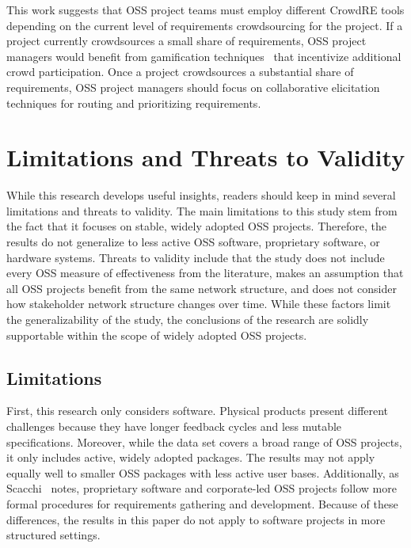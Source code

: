This work suggests that OSS project teams must employ different CrowdRE tools depending on the current level of requirements crowdsourcing for the project. If a project currently crowdsources a small share of requirements, OSS project managers would benefit from gamification techniques~\cite{snijders, snijders2} that incentivize additional crowd participation. Once a project crowdsources a substantial share of requirements, OSS project managers should focus on collaborative elicitation techniques for routing and prioritizing requirements.

\section{Limitations and Threats to Validity}
\label{limitations}

While this research develops useful insights, readers should keep in mind several limitations and threats to validity. The main limitations to this study stem from the fact that it focuses on stable, widely adopted OSS projects. Therefore, the results do not generalize to less active OSS software, proprietary software, or hardware systems. Threats to validity include that the study does not include every OSS measure of effectiveness from the literature, makes an assumption that all OSS projects benefit from the same network structure, and does not consider how stakeholder network structure changes over time. While these factors limit the generalizability of the study, the conclusions of the research are solidly supportable within the scope of widely adopted OSS projects.

\subsection{Limitations}

First, this research only considers software. Physical products present different challenges because they have longer feedback cycles and less mutable specifications. Moreover, while the data set covers a broad range of OSS projects, it only includes active, widely adopted packages. The results may not apply equally well to smaller OSS packages with less active user bases. Additionally, as Scacchi~\cite{scacchi} notes, proprietary software and corporate-led OSS projects follow more formal procedures for requirements gathering and development. Because of these differences, the results in this paper do not apply to software projects in more structured settings.

